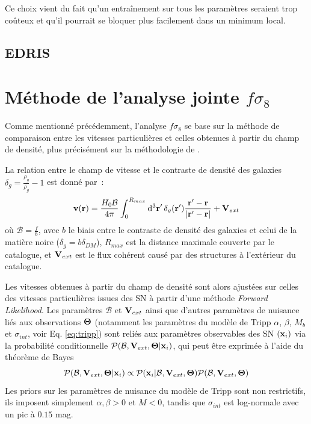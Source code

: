 \documentclass{book}
\let\mcl\mathcal
\let\ov\overline
\begin{document}
Ce choix vient du fait qu'un entraînement sur tous les paramètres seraient trop coûteux et qu'il pourrait se bloquer plus facilement dans un minimum local.


\subsection{EDRIS}


\section{Méthode de l'analyse jointe $f\sigma_8$}

Comme mentionné précédemment, l'analyse $f\sigma_8$ se base sur la méthode de comparaison entre les vitesses particulières et celles obtenues à partir du champ de densité, plus précisément sur la méthodologie de \cite{stahl_peculiar-velocity_2021}.

La relation entre le champ de vitesse et le contraste de densité des galaxies $\delta_g = \frac{\rho_g}{\ov{\rho_g}} - 1$ est donné par~:
\begin{equation}
    \vb v (\vb r) = \frac{H_0 \mcl B}{4 \pi} \int_0^{R_{max}} \dd[3]{\vb r'} \delta_g(\vb r') \frac{\vb r' - \vb r}{\abs{\vb r' - \vb r}} + \vb V_{ext}
\end{equation}
où $\mcl B =\frac{f}{b}$, avec $b$ le biais entre le contraste de densité des galaxies et celui de la matière noire ($\delta_g = b \delta_{DM}$), $R_{max}$ est la distance maximale couverte par le catalogue, et $\vb V_{ext}$ est le flux cohérent causé par des structures à l'extérieur du catalogue.

Les vitesses obtenues à partir du champ de densité sont alors ajustées sur celles des vitesses particulières issues des SN à partir d'une méthode \textit{Forward Likelihood}. Les paramètres $\mcl B$ et $\vb V_{ext}$ ainsi que d'autres paramètres de nuisance liés aux observations $\vb \Theta$ (notamment les paramètres du modèle de Tripp $\alpha$, $\beta$, $M_b$ et $\sigma_{int}$, voir Eq. \ref{eq:tripp}) sont reliés aux paramètres observables des SN $(\vb x_i)$ via la probabilité conditionnelle $\mcl P(\mcl B, \vb V_{ext}, \vb \Theta | \vb x_i)$, qui peut être exprimée à l'aide du théorème de Bayes
\begin{equation}
    \mcl P(\mcl B, \vb V_{ext}, \vb \Theta | \vb x_i) \propto \mcl P(\vb x_i|\mcl B, \vb V_{ext}, \vb \Theta) \mcl P(\mcl B, \vb V_{ext}, \vb \Theta)
\end{equation}
Les priors sur les paramètres de nuisance du modèle de Tripp sont non restrictifs, ils imposent simplement $\alpha, \beta > 0$ et $M < 0$, tandis que $\sigma_{int}$ est log-normale avec un pic à $0.15$ mag.
\end{document}
